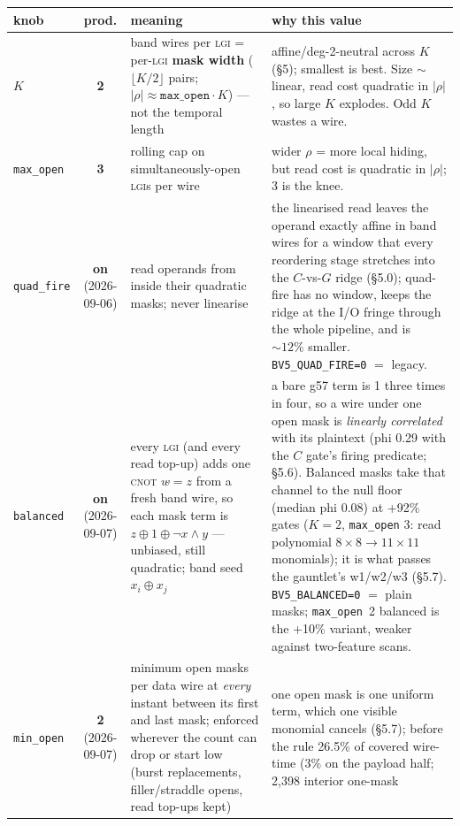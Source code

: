 \documentclass[11pt]{article}
\newcommand{\g}{\textsf{g57}}
\newcommand{\doc}[1]{\texttt{#1}}
\newcommand{\xor}{\oplus}
\newcommand{\lgi}{\textsc{lgi}}
\begin{document}
\begin{table}[H]\centering\small
\begin{tabular}{@{}lcL{3.4cm}L{5.0cm}@{}}
\toprule
knob & prod. & meaning & why this value \\
\midrule
$K$ & \textbf{2} & band wires per \lgi{} = per-\lgi{} \textbf{mask width}
  ($\lfloor K/2\rfloor$ pairs; $|\rho|\approx\doc{max\_open}\cdot K$) --- not the
  temporal length & affine/deg-2-neutral across $K$ (\S5); smallest is best. Size
  $\sim$linear, read cost quadratic in $|\rho|$, so large $K$ explodes. Odd $K$
  wastes a wire. \\
\addlinespace
\doc{max\_open} & \textbf{3} & rolling cap on simultaneously-open \lgi s per wire
  & wider $\rho$ = more local hiding, but read cost is quadratic in $|\rho|$; 3 is
  the knee. \\
\addlinespace
\doc{quad\_fire} & \textbf{on} (2026-09-06) & read operands from inside their
  quadratic masks; never linearise & the linearised read leaves the operand exactly
  affine in band wires for a window that every reordering stage stretches into the
  $C$-vs-$G$ ridge (\S5.0); quad-fire has no window, keeps the ridge at the I/O
  fringe through the whole pipeline, and is ${\sim}12\%$ smaller.
  \doc{BV5\_QUAD\_FIRE=0} $=$ legacy. \\
\addlinespace
\doc{balanced} & \textbf{on} (2026-09-07) & every \lgi{} (and
  every read top-up) adds one \textsc{cnot} $w \mathrel{\hat{}}= z$ from a fresh band
  wire, so each mask term is $z \xor 1 \xor \neg x{\wedge}y$ --- unbiased, still
  quadratic; band seed $x_i \xor x_j$ & a bare \g{} term is 1 three times in four,
  so a wire under one open mask is \emph{linearly correlated} with its plaintext
  (phi 0.29 with the $C$ gate's firing predicate; \S5.6). Balanced masks take that
  channel to the null floor (median phi 0.08) at +92\% gates ($K{=}2$,
  \doc{max\_open} 3: read polynomial $8{\times}8 \to 11{\times}11$ monomials); it is
  what passes the gauntlet's w1/w2/w3 (\S5.7). \doc{BV5\_BALANCED=0} $=$ plain masks;
  \doc{max\_open}~2 balanced is the +10\% variant, weaker against two-feature scans. \\
\addlinespace
\doc{min\_open} & \textbf{2} (2026-09-07) & minimum open masks per data wire at
  \emph{every} instant between its first and last mask; enforced wherever the count can
  drop or start low (burst replacements, filler/straddle opens, read top-ups kept) & one
  open mask is one uniform term, which one visible monomial cancels (\S5.7); before the
  rule 26.5\% of covered wire-time (3\% on the payload half; 2,398 interior one-mask

\end{tabular}
\end{table}
\end{document}
